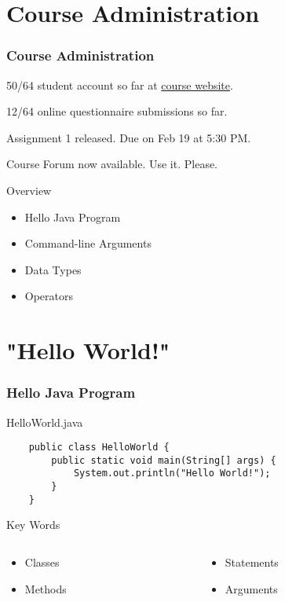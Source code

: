 \documentclass[10pt, compress]{beamer}
\begin{document}
\prepareCover

\section{Course Administration}

\begin{frame}[fragile]
\frametitle{Course Administration}
  50/64 student account so far at \href{http://ghorbanzade.com/}{course website}.

  12/64 online questionnaire submissions so far.

  Assignment 1 released. Due on Feb 19 at 5:30 PM.

  Course Forum now available. Use it. Please.
\end{frame}

\begin{frame}{Overview}
  \begin{itemize}
    \item[] Hello Java Program
    \item[] Command-line Arguments
    \item[] Data Types
    \item[] Operators
  \end{itemize}
\end{frame}

\section{"Hello World!"}

\begin{frame}[fragile]
  \frametitle{Hello Java Program}
  \begin{block}{HelloWorld.java}
    \begin{verbatim}
    public class HelloWorld {
        public static void main(String[] args) {
            System.out.println("Hello World!");
        }
    }
    \end{verbatim}
  \end{block}
  \begin{block}{Key Words}
    \begin{columns}
    \begin{column}{0.5\textwidth}
      \begin{itemize}
        \item[] Classes
        \item[] Methods
      \end{itemize}
    \end{column}
    \begin{column}{0.5\textwidth}
      \begin{itemize}
        \item[] Statements
        \item[] Arguments
      \end{itemize}
    \end{column}
    \end{columns}
  \end{block}
\end{frame}
\end{document}
